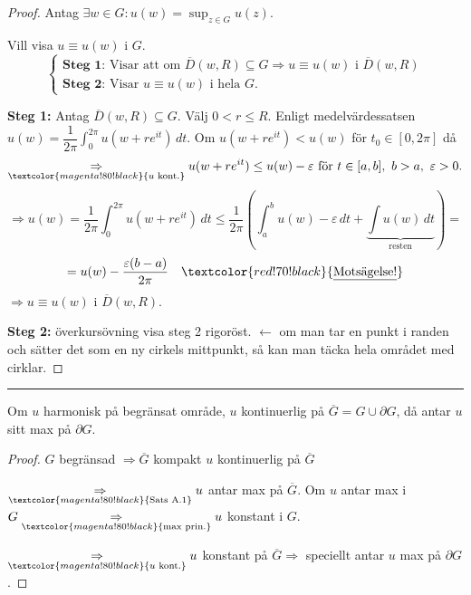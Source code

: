 \begin{proof}
Antag $\exists w \in G : u(w) = \sup_{z \in G} u(z)$.

Vill visa $u \equiv u(w)$ i $G$.
\[ \left\{ \begin{array}{l} \textbf{Steg 1:} \text{ Visar att om } \overline{D}(w, R) \subseteq G \Rightarrow u \equiv u(w) \text{ i } \overline{D}(w, R) \\ \textbf{Steg 2:} \text{ Visar } u \equiv u(w) \text{ i hela } G. \end{array} \right. \]

\textcolor{red!70!black}{\textbf{Steg 1:}} Antag $\overline{D}(w, R) \subseteq G$. Välj $0 < r \le R$. Enligt medelvärdessatsen $u(w) = \dfrac{1}{2\pi} \displaystyle\int_0^{2\pi} u(w + re^{it})\,dt$. Om $u(w + re^{it}) < u(w)$ för $t_0 \in [0, 2\pi]$ då
\[ \underset{\textcolor{magenta!80!black}{u \text{ kont.}}}{\Rightarrow} u(w + re^{it}) \le u(w) - \varepsilon \text{ för } t \in [a, b],\ b > a,\ \varepsilon > 0. \]
\[ \Rightarrow u(w) = \frac{1}{2\pi} \int_0^{2\pi} u(w + re^{it})\,dt \le \frac{1}{2\pi}\left( \int_a^b u(w) - \varepsilon\,dt + \underbrace{\int u(w)\,dt}_{\text{resten}} \right) = \]
\[ = u(w) - \frac{\varepsilon(b - a)}{2\pi} \quad \textcolor{red!70!black}{\underline{\text{Motsägelse!}}} \]
$\Rightarrow u \equiv u(w)$ i $\overline{D}(w, R)$.

\textcolor{red!70!black}{\textbf{Steg 2:}} \quad överkursövning visa steg 2 rigoröst.
\textcolor{magenta!80!black}{$\leftarrow$ om man tar en punkt i randen och sätter det som en ny cirkels mittpunkt, så kan man täcka hela området med cirklar.}
\end{proof}

\noindent\rule{\linewidth}{0.4pt}

\begin{theorem}
Om $u$ harmonisk på begränsat område, $u$ kontinuerlig på $\overline{G} = G \cup \partial G$, då antar $u$ sitt max på $\partial G$.
\end{theorem}
\begin{proof}
$G$ begränsad $\Rightarrow \overline{G}$ kompakt $u$ kontinuerlig på $\overline{G}$

$\underset{\textcolor{magenta!80!black}{\text{Sats A.1}}}{\Rightarrow} u$ antar max på $\overline{G}$. Om $u$ antar max i $G \underset{\textcolor{magenta!80!black}{\text{max prin.}}}{\Rightarrow} u$ konstant i $G$.

$\underset{\textcolor{magenta!80!black}{u \text{ kont.}}}{\Rightarrow} u$ konstant på $\overline{G} \Rightarrow$ speciellt antar $u$ max på $\partial G$.
\end{proof}
